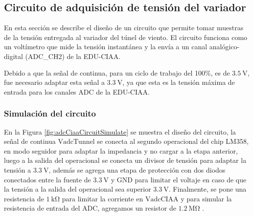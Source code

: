 \subsection{Circuito de adquisición de tensión del variador}\label{sec:adquisicionVadcTunel}

En esta sección se describe el diseño de un circuito que permite tomar muestras de la tensión entregada al variador del túnel de viento. El circuito funciona como un voltímetro que mide la tensión instantánea y la envía a un canal analógico-digital (ADC\_CH2) de la EDU-CIAA. 

Debido a que la señal de continua, para un ciclo de trabajo del 100\%, es de $\SI{3.5}{\volt}$, fue necesario adaptar esta señal a $\SI{3.3}{\volt}$, ya que esta es la tensión máxima de entrada para los canales ADC de la EDU-CIAA.

\subsubsection{Simulación del circuito}

En la Figura \ref{fig:adcCiaaCircuitSimulate} se muestra el diseño del circuito, la señal de continua $\text{VadcTunnel}$ se conecta al segundo operacional del chip LM358, en modo seguidor para adaptar la impedancia y no cargar a la etapa anterior, luego a la salida del operacional se conecta un divisor de tensión para adaptar la tensión a $\SI{3.3}{\volt}$, además se agrega una etapa de protección con dos diodos conectados entre la fuente de $\SI{3.3}{\volt}$ y GND para limitar el voltaje en caso de que la tensión a la salida del operacional sea superior  $\SI{3.3}{\volt}$. Finalmente, se pone una resistencia de $\SI{1}{\kilo\ohm}$ para limitar la corriente en  $\text{VadcCIAA}$ y para simular la resistencia de entrada del ADC, agregamos un resistor de $\SI{1.2}{\mega\ohm}$ \cite{LPC435x_datasheet}.

